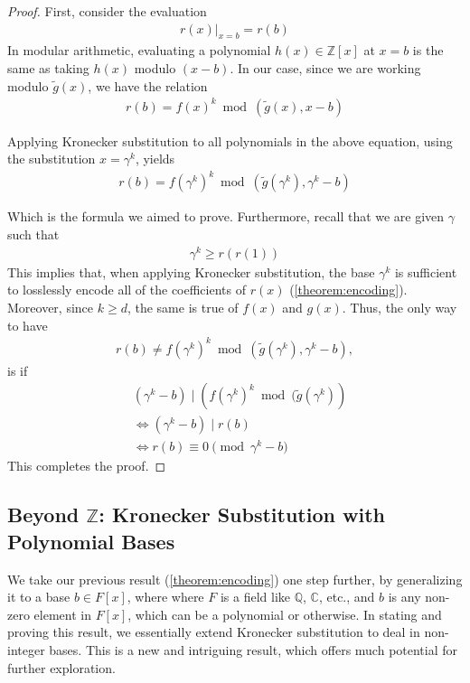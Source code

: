\documentclass[12pt,reqno]{article}
\theoremstyle{plain}
\theoremstyle{definition}
\newcommand{\eval}[2]{\left . #1 \right|_{#2}}
\begin{document}
\begin{proof}
First, consider the evaluation 
\begin{align*}
    \eval{r(x)}{x=b} = r(b)
\end{align*}
In modular arithmetic, evaluating a polynomial $h(x) \in \mathbb{Z}[x]$ at $x=b$ is the same as taking $h(x)$ modulo $(x - b)$. In our case, since we are working modulo $\tilde{g}(x)$, we have the relation
\begin{align*}
    r(b) = f(x)^k \bmod{(\tilde{g}(x), x - b)}
\end{align*}

Applying Kronecker substitution to all polynomials in the above equation, using the substitution $x = \gamma^k$, yields
\begin{align*}
    r(b) = f(\gamma^k)^k \bmod{(\tilde{g}(\gamma^k), \gamma^k - b)}
\end{align*}

Which is the formula we aimed to prove. Furthermore, recall that we are given $\gamma$ such that
\begin{align*}
    \gamma^k \geq r(r(1))
\end{align*}
This implies that, when applying Kronecker substitution, the base $\gamma^k$ is sufficient to losslessly encode all of the coefficients of $r(x)$ (\cref{theorem:encoding}). Moreover, since $k \geq d$, the same is true of $f(x)$ and $g(x)$. Thus, the only way to have
\begin{align}
    r(b) \not= f(\gamma^k)^k \bmod{(\tilde{g}(\gamma^k), \gamma^k - b)} ,
\end{align}
is if
\begin{align*}
    & (\gamma^k - b) \mid (f(\gamma^k)^k \bmod{(\tilde{g}(\gamma^k)}) \\
    & \Longleftrightarrow (\gamma^k - b) \mid r(b) \\
    & \Longleftrightarrow r(b) \equiv 0 \pmod{\gamma^k - b}
\end{align*}
This completes the proof.
\end{proof}

\subsection[Beyond Integers: Kronecker Substitution with Polynomial Bases]{Beyond $\mathbb{Z}$: Kronecker Substitution with Polynomial Bases}
We take our previous result (\cref{theorem:encoding}) one step further, by generalizing it to a base $b \in F[x]$, where where $F$ is a field like $\mathbb{Q}$, $\mathbb{C}$, etc., and $b$ is any non-zero element in $F[x]$, which can be a polynomial or otherwise. In stating and proving this result, we essentially extend Kronecker substitution to deal in non-integer bases. This is a new and intriguing result, which offers much potential for further exploration.
\end{document}
